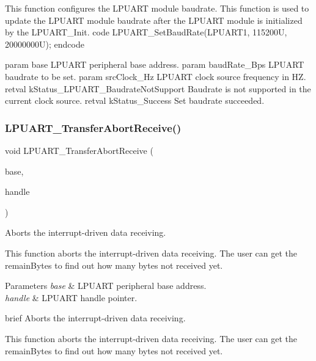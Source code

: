 This function configures the L\+P\+U\+A\+RT module baudrate. This function is used to update the L\+P\+U\+A\+RT module baudrate after the L\+P\+U\+A\+RT module is initialized by the L\+P\+U\+A\+R\+T\+\_\+\+Init. code L\+P\+U\+A\+R\+T\+\_\+\+Set\+Baud\+Rate(\+L\+P\+U\+A\+R\+T1, 115200\+U, 20000000\+U); endcode

param base L\+P\+U\+A\+RT peripheral base address. param baud\+Rate\+\_\+\+Bps L\+P\+U\+A\+RT baudrate to be set. param src\+Clock\+\_\+\+Hz L\+P\+U\+A\+RT clock source frequency in HZ. retval k\+Status\+\_\+\+L\+P\+U\+A\+R\+T\+\_\+\+Baudrate\+Not\+Support Baudrate is not supported in the current clock source. retval k\+Status\+\_\+\+Success Set baudrate succeeded. \mbox{\label{group__lpuart__driver_ga4950fa0f3835992251c109f655a3ca7d}} 
\subsubsection{\texorpdfstring{LPUART\_TransferAbortReceive()}{LPUART\_TransferAbortReceive()}}
{\footnotesize\ttfamily void L\+P\+U\+A\+R\+T\+\_\+\+Transfer\+Abort\+Receive (\begin{DoxyParamCaption}\item[{\mbox{\hyperlink{struct_l_p_u_a_r_t___type}{L\+P\+U\+A\+R\+T\+\_\+\+Type}} $\ast$}]{base,  }\item[{\mbox{\hyperlink{struct__lpuart__handle}{lpuart\+\_\+handle\+\_\+t}} $\ast$}]{handle }\end{DoxyParamCaption})}



Aborts the interrupt-\/driven data receiving. 

This function aborts the interrupt-\/driven data receiving. The user can get the remain\+Bytes to find out how many bytes not received yet.


\begin{DoxyParams}{Parameters}
{\em base} & L\+P\+U\+A\+RT peripheral base address. \\
\hline
{\em handle} & L\+P\+U\+A\+RT handle pointer.\\
\hline
\end{DoxyParams}
brief Aborts the interrupt-\/driven data receiving.

This function aborts the interrupt-\/driven data receiving. The user can get the remain\+Bytes to find out how many bytes not received yet.

